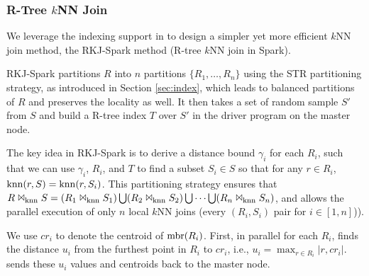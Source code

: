 \subsubsection{R-Tree $k$NN Join}
\label{subsub:rtknnj} 
We leverage the indexing support in \name to design a simpler yet more
efficient $k$NN join method, the RKJ-Spark method (R-tree $k$NN join
in Spark).

RKJ-Spark partitions $R$ into $n$ partitions $\{R_1, \ldots, R_n\}$
using the STR partitioning strategy, as introduced in Section \ref{sec:index},
which leads to balanced partitions of $R$ and preserves the locality
as well. It then takes a set of random sample $S'$ from $S$ and build
a R-tree index $T$ over $S'$ in the driver program on the master node.


The key idea in RKJ-Spark is to derive a distance bound $\gamma_i$ for
each $R_i$, such that we can use $\gamma_i$, $R_i$, and $T$ to find a
subset $S_i\in S$ so that for any $r\in R_i$, $\operatorname{knn}(r, S)=\operatorname{knn}(r,
S_i)$. This partitioning strategy ensures that $R \Join_{\operatorname{knn}} S =
(R_1 \Join_{\operatorname{knn}} S_1) \bigcup (R_2 \Join_{\operatorname{knn}} S_2)\bigcup \cdots
\bigcup (R_n \Join_{\operatorname{knn}} S_n)$, and allows the parallel execution of
only $n$ local $k$NN joins (every $(R_i, S_i)$ pair for $i\in[1, n]$)).


We use $cr_i$ to denote the centroid of $\operatorname{mbr}(R_i)$. First, in
parallel for each $R_i$, \name finds the distance $u_i$ from the
furthest point in $R_i$ to $cr_i$, i.e., $u_i=\max_{r\in R_i}|r,
cr_i|$. \name sends these $u_i$ values and centroids back to the
master node.

